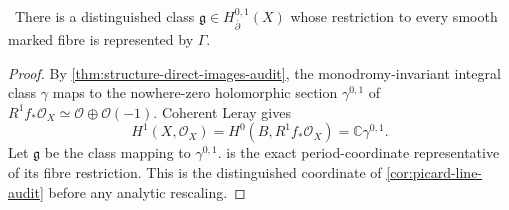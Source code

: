 \begin{lemma}
\label{lem:bcpr-degree-one-input}
\Verified\ There is a distinguished class
$\mathfrak g\in H^{0,1}_{\bar\partial}(X)$ whose restriction to every
smooth marked fibre is represented by $\Gamma$.
\end{lemma}

\begin{proof}
By \cref{thm:structure-direct-images-audit}, the monodromy-invariant
integral class $\gamma$ maps to the nowhere-zero holomorphic section
$\gamma^{0,1}$ of
$R^1f_*\mathcal O_X\simeq\mathcal O\oplus\mathcal O(-1)$.  Coherent
Leray gives
\[
 H^1(X,\mathcal O_X)=H^0(B,R^1f_*\mathcal O_X)
 =\mathbb C\gamma^{0,1}.
\]
Let $\mathfrak g$ be the class mapping to $\gamma^{0,1}$.
 is the exact period-coordinate
representative of its fibre restriction.  This is the distinguished
coordinate of \cref{cor:picard-line-audit} before any analytic rescaling.
\end{proof}
